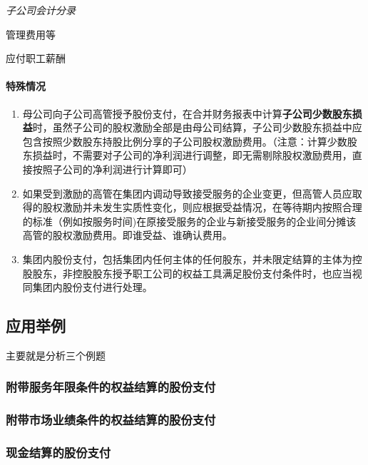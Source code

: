 \documentclass[UTF8,12pt]{ctexart}
\newenvironment{Dr}{%
	\begin{list}{}%
		{
			\setlength{\leftmargin}{2em}
			\setlength{\labelwidth}{2em}
			\setlength{\labelsep}{0pt}
			\setlength{\itemindent}{0pt}
			\setlength{\listparindent}{0pt}
			\setlength{\parsep}{0pt}
			\setlength{\topsep}{0pt}
		}
		\item[\textbf{借：}]
	}{%
	\end{list}
}
\newenvironment{Cr}{%
	\begin{list}{}%
		{
			\setlength{\leftmargin}{3em}
			\setlength{\labelwidth}{2em}
			\setlength{\labelsep}{0pt}
			\setlength{\itemindent}{0pt}
			\setlength{\listparindent}{0pt}
			\setlength{\parsep}{0pt}
			\setlength{\topsep}{0pt}
		}
		\item[\textbf{贷：}]
	}{%
	\end{list}
}
\numberwithin{equation}{section} %
\numberwithin{figure}{section}
\numberwithin{table}{section}
\begin{document}
	\textit{子公司会计分录}
	
	\begin{Dr}
		管理费用等
	\end{Dr}
	\begin{Cr}
		应付职工薪酬
	\end{Cr}
	
	\paragraph{特殊情况}
	\begin{enumerate}
		\item 母公司向子公司高管授予股份支付，在合并财务报表中计算\textbf{子公司少数股东损益}时，虽然子公司的股权激励全部是由母公司结算，子公司少数股东损益中应包含按照少数股东持股比例分享的子公司股权激励费用。（注意：计算少数股东损益时，不需要对子公司的净利润进行调整，即无需剔除股权激励费用，直接按照子公司的净利润进行计算即可）
		
		\item 如果受到激励的高管在集团内调动导致接受服务的企业变更，但高管人员应取得的股权激励并未发生实质性变化，则应根据受益情况，在等待期内按照合理的标准（例如按服务时间)在原接受服务的企业与新接受服务的企业间分摊该高管的股权激励费用。即谁受益、谁确认费用。
		
		\item 集团内股份支付，包括集团内任何主体的任何股东，并未限定结算的主体为控股股东，非控股股东授予职工公司的权益工具满足股份支付条件时，也应当视同集团内股份支付进行处理。
	\end{enumerate}

	
	\subsection{应用举例}
	主要就是分析三个例题
	
	\subsubsection{附带服务年限条件的权益结算的股份支付}
	
	\subsubsection{附带市场业绩条件的权益结算的股份支付}
	
	\subsubsection{现金结算的股份支付}
	
\end{document}
